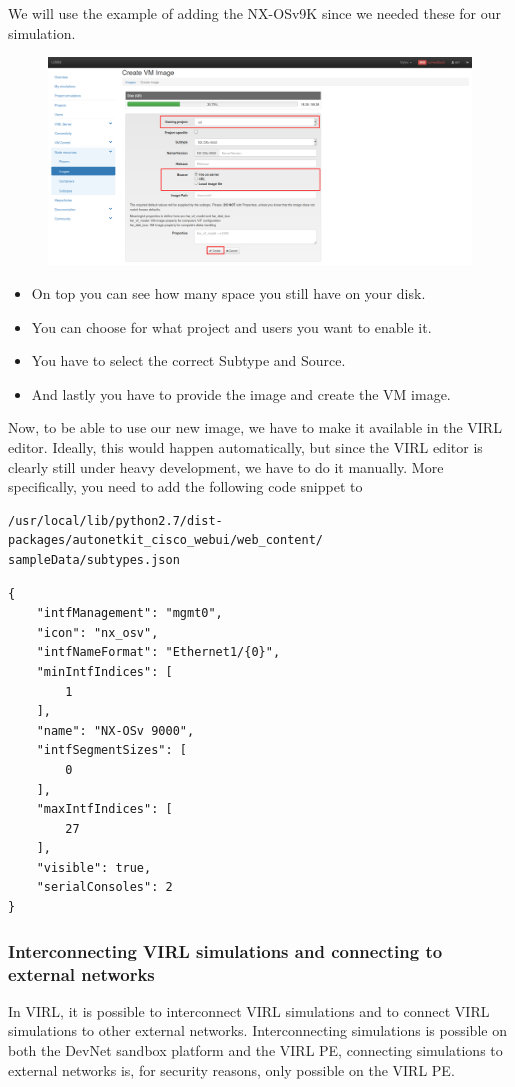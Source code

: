 \documentclass{article}
\begin{document}
We will use the example of adding the NX-OSv9K since we needed these for our simulation.

\newpage
\begin{figure}[H]
	\centering
	\includegraphics[width=\textwidth]{images/CreateVMimage.png}
\end{figure}

\begin{itemize}
	\item On top you can see how many space you still have on your disk.
	\item You can choose for what project and users you want to enable it.
	\item You have to select the correct Subtype and Source.
	\item And lastly you have to provide the image and create the VM image.
\end{itemize}

Now, to be able to use our new image, we have to make it available in the VIRL editor.
Ideally, this would happen automatically,
but since the VIRL editor is clearly still under heavy development,
we have to do it manually.
More specifically, you need to add the following code snippet to
\begin{verbatim}
/usr/local/lib/python2.7/dist-packages/autonetkit_cisco_webui/web_content/
sampleData/subtypes.json
\end{verbatim}

\begin{lstlisting}[caption=JSON code for NX-OSv 9000]
{
	"intfManagement": "mgmt0",
	"icon": "nx_osv",
	"intfNameFormat": "Ethernet1/{0}",
	"minIntfIndices": [
		1
	],
	"name": "NX-OSv 9000",
	"intfSegmentSizes": [
		0
	],
	"maxIntfIndices": [
		27
	],
	"visible": true,
	"serialConsoles": 2
}
\end{lstlisting}

\subsubsection{Interconnecting VIRL simulations and connecting to external networks}
In VIRL, it is possible to interconnect VIRL simulations
and to connect VIRL simulations to other external networks.
Interconnecting simulations is possible on both the DevNet sandbox platform and the VIRL PE,
connecting simulations to external networks is, for security reasons, only possible on the VIRL PE.
\end{document}
